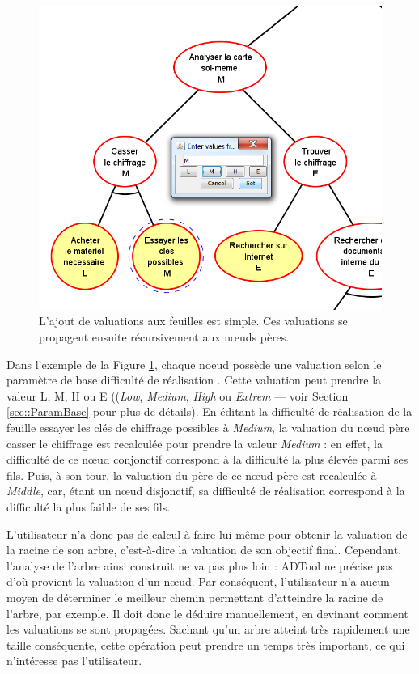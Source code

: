 	\begin{figure}[h]
            \centering
            \includegraphics[width=1\textwidth]{figure/adtool_add_values.png}
            \caption{L'ajout de valuations aux feuilles est simple. Ces valuations se propagent ensuite récursivement aux nœuds pères.}
            \label{fig:arbre_exemple_1}
    \end{figure}
	
	Dans l'exemple de la {\sc Figure} \ref{fig:arbre_exemple_1}, chaque noeud possède une valuation selon le paramètre de base \og difficulté de réalisation \fg{}. Cette valuation peut prendre la valeur L, M, H ou E ((\emph{Low}, \emph{Medium}, \emph{High} ou \emph{Extrem} --- voir Section \ref{sec::ParamBase} pour plus de détails). En éditant la difficulté de réalisation de la feuille \og essayer les clés de chiffrage possibles \fg{}  à \emph{Medium}, la valuation du nœud père \og casser le chiffrage \fg{} est recalculée pour prendre la valeur \emph{Medium} : en effet, la difficulté de ce nœud conjonctif correspond à la difficulté la plus élevée parmi ses fils. Puis, à son tour, la valuation du père de ce nœud-père est recalculée à \emph{Middle}, car, étant un nœud disjonctif, sa difficulté de réalisation correspond à la difficulté la plus faible de ses fils.
	
	L'utilisateur n'a donc pas de calcul à faire lui-même pour obtenir la valuation de la racine de son arbre, c'est-à-dire la valuation de son objectif final. Cependant, l'analyse de l'arbre ainsi construit ne va pas plus loin : ADTool ne précise pas d'où provient la valuation d'un nœud. Par conséquent, l'utilisateur n'a aucun moyen de déterminer le \og meilleur chemin \fg{} permettant d'atteindre la racine de l'arbre, par exemple. Il doit donc le déduire manuellement, en devinant comment les valuations se sont propagées. Sachant qu'un arbre atteint très rapidement une taille conséquente, cette opération peut prendre un temps très important, ce qui n'intéresse pas l'utilisateur.
	
